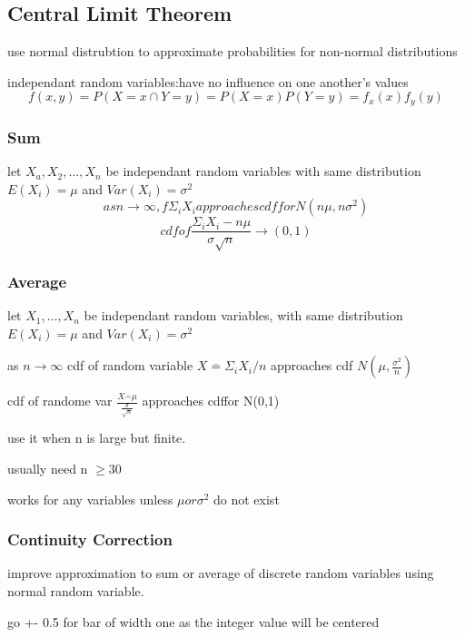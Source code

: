 \documentclass[11pt]{amsart}
\begin{document}
  \subsection{Central Limit Theorem}
  \par use normal distrubtion to approximate probabilities for non-normal
  distributions
  \par independant random variables:have no influence on one another's values
  \begin{equation}
    f(x,y) = P(X=x \cap Y=y) = P(X = x)P(Y=y) = f_x(x) f_y(y)
  \end{equation}
  \subsubsection{Sum}
  \par let $X_a, X_2, \dots, X_n$ be independant random variables with same
  distribution $E(X_i) = \mu$ and $Var(X_i) = \sigma^2$
  \begin{equation}
    as n\rightarrow \infty,
    f \Sigma_iX_i approaches cdf for N(n\mu, n\sigma^2)
  \end{equation}
  \begin{equation}
    cdf of \frac{\Sigma_iX_i-n\mu}{\sigma\sqrt{n}} \rightarrow(0,1)
  \end{equation}
  \subsubsection{Average}
  \par let $X_1, \dots, X_n$ be independant random variables, with same
  distribution $E(X_i) = \mu$ and $Var(X_i) = \sigma^2$
  \par as $n\rightarrow\infty$ cdf of random variable $X\bar = \Sigma_iX_i/n$
  approaches cdf $N(\mu, \frac{\sigma^2}{n})$
  \par cdf of randome var $\frac{X\bar - \mu}{\frac{\sigma}{\sqrt{n}}}$
  approaches cdffor N(0,1)
  \begin{enum}
  \item use it when n is large but finite.
  \item usually need n $\ge $30
  \item works for any variables unless $\mu or \sigma^2$ do not exist
  \end{enum}
  \subsubsection{Continuity Correction}
  \par improve approximation to sum or average of discrete random variables
  using normal random variable.
  \par go +- 0.5 for bar of width one as the integer value will be centered
\end{document}
